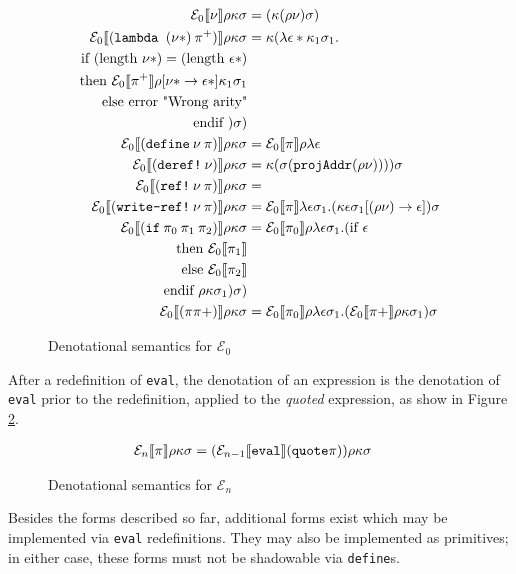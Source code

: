 \begin{figure}[H]
\begin{align*}
    \denotationdesc{0}{\variable}{(\cont (\env \variable) \mem)} \\
    \denotationdesc{0}{(\lam (\variable *)\: \pi^{+})}{
      \cont (\lambda \val * \cont_1 \mem_1 . \\
        \text{if } (\text{length } \variable *) = (\text{length } \val *) \\
        \text{then } \denotation{0}{\pi^{+}}\env[\variable * \rightarrow} \val * ] \cont_1 \mem_1 \\
        \text{else } \text{error "Wrong arity"} \\
        \text{endif } ) \mem ) \\
    \denotationdesc{0}{(\define \: \variable \: \pi )}{
      \denotation{0}{\pi}\env \lambda \val
    } \\
    \denotationdesc{0}{(\deref \: \variable  )}{\cont (\mem (\texttt{projAddr}(\env \variable)))) \mem} \\
  \denotationdesc{0}{(\mkref \: \variable \: \pi)}{} \\
  \denotationdesc{0}{(\writeref \: \variable \: \pi)}{
      \denotation{0}{\pi} \lambda \val \mem_1 . (\cont \val \mem_1 [(\env
      \variable) \rightarrow \val]) \mem } \\
  \denotationdesc{0}{(\ifm \: \pi_0 \: \pi_1 \: \pi_2)}{\denotation{0}{\pi_0}\env
    \lambda \val \mem_1 .(\text{if } \val  \\
    \text{then } \denotation{0}{\pi_1}  \\
    \text{else } \denotation{0}{\pi_2} \\
    \text{endif } \env \cont \mem_1)  \mem ) } \\
  \denotationdesc{0}{(\pi \pi+ )}{
      \denotation{0}{\pi_0}\env \lambda \val \mem_1 . (\denotation{0}{\pi+}
      \env \cont \mem_1) \mem
  }
\end{align*}
\caption{Denotational semantics for $\mathcal{E}_{0}$}
\label{f:denotationalsem0}
\end{figure}

After a redefinition of \texttt{eval}, the denotation of an expression is the
denotation of \texttt{eval} prior to the redefinition, applied to the
\textit{quoted} expression, as show in Figure \ref{f:denotationalsemn}.

\begin{figure}[H]
\begin{align*}
  \mathcal{E}_{n} \llbracket \pi \rrbracket \rho \kappa \sigma &= (\mathcal{E}_{n-1} \llbracket \text{\texttt{eval}} \rrbracket  (\text{\texttt{quote}} \pi))\rho\kappa\sigma 
\end{align*}
\caption{Denotational semantics for $\mathcal{E}_{n}$}
\label{f:denotationalsemn}
\end{figure}

Besides the forms described so far, additional forms exist which may be
implemented via \texttt{eval} redefinitions. They may also be implemented as
primitives; in either case, these forms must not be shadowable via
\texttt{define}s.
